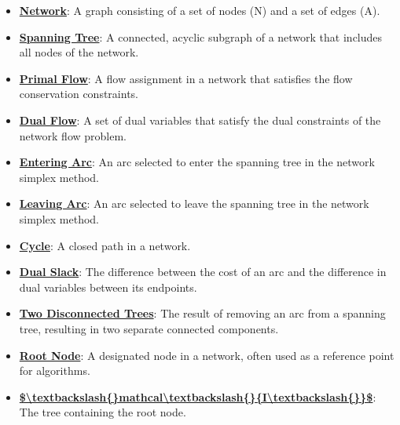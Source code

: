 \documentclass{article}%
\begin{document}
\begin{itemize}[leftmargin=*]%
\item \href{https://www.math.purdue.edu/~yipn/421/2024-11-07-NetSimplex.pdf#page=1}{\textbf{Network}}: A graph consisting of a set of nodes (N) and a set of edges (A).%
\item \href{https://www.math.purdue.edu/~yipn/421/2024-11-07-NetSimplex.pdf#page=1}{\textbf{Spanning Tree}}: A connected, acyclic subgraph of a network that includes all nodes of the network.%
\item \href{https://www.math.purdue.edu/~yipn/421/2024-11-07-NetSimplex.pdf#page=2}{\textbf{Primal Flow}}: A flow assignment in a network that satisfies the flow conservation constraints.%
\item \href{https://www.math.purdue.edu/~yipn/421/2024-11-07-NetSimplex.pdf#page=3}{\textbf{Dual Flow}}: A set of dual variables that satisfy the dual constraints of the network flow problem.%
\item \href{https://www.math.purdue.edu/~yipn/421/2024-11-07-NetSimplex.pdf#page=6}{\textbf{Entering Arc}}: An arc selected to enter the spanning tree in the network simplex method.%
\item \href{https://www.math.purdue.edu/~yipn/421/2024-11-07-NetSimplex.pdf#page=6}{\textbf{Leaving Arc}}: An arc selected to leave the spanning tree in the network simplex method.%
\item \href{https://www.math.purdue.edu/~yipn/421/2024-11-07-NetSimplex.pdf#page=4}{\textbf{Cycle}}: A closed path in a network.%
\item \href{https://www.math.purdue.edu/~yipn/421/2024-11-07-NetSimplex.pdf#page=3}{\textbf{Dual Slack}}: The difference between the cost of an arc and the difference in dual variables between its endpoints.%
\item \href{https://www.math.purdue.edu/~yipn/421/2024-11-07-NetSimplex.pdf#page=11}{\textbf{Two Disconnected Trees}}: The result of removing an arc from a spanning tree, resulting in two separate connected components.%
\item \href{https://www.math.purdue.edu/~yipn/421/2024-11-07-NetSimplex.pdf#page=12}{\textbf{Root Node}}: A designated node in a network, often used as a reference point for algorithms.%
\item \href{https://www.math.purdue.edu/~yipn/421/2024-11-07-NetSimplex.pdf#page=14}{\textbf{\$\textbackslash{}textbackslash\{\}mathcal\textbackslash{}textbackslash\{\}\{I\textbackslash{}textbackslash\{\}\}\$}}: The tree containing the root node.%

\end{itemize}
\end{document}
